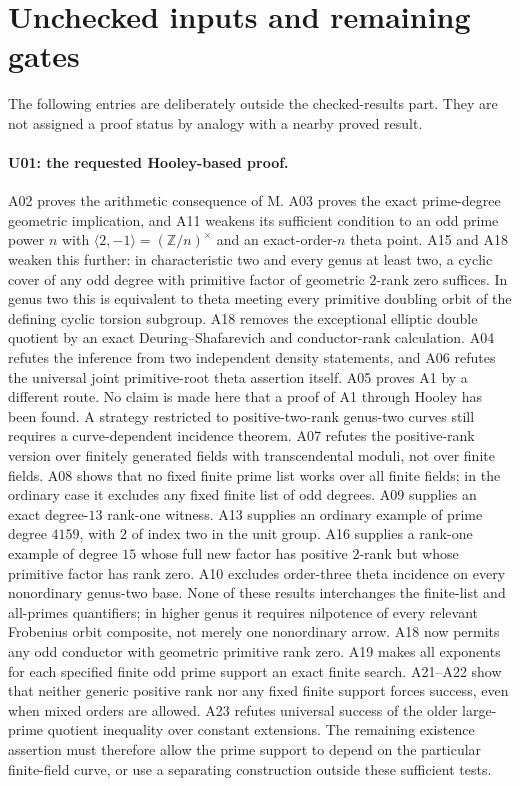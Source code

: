 \section{Unchecked inputs and remaining gates}
\label{sec:remaining}

The following entries are deliberately outside the checked-results
part. They are not assigned a proof status by analogy with a nearby
proved result.

\paragraph{U01: the requested Hooley-based proof.}
A02 proves the arithmetic consequence of M. A03 proves the exact
prime-degree geometric implication, and A11 weakens its sufficient
condition to an odd prime power $n$ with
$\langle2,-1\rangle=(\mathbb Z/n)^\times$ and an exact-order-$n$
theta point. A15 and A18 weaken this further: in characteristic two and every
genus at least two, a cyclic cover of any odd degree with primitive
factor of geometric $2$-rank zero suffices. In genus two this is
equivalent to theta meeting every primitive doubling orbit of the
defining cyclic torsion subgroup. A18 removes the exceptional
elliptic double quotient by an exact Deuring--Shafarevich and
conductor-rank calculation.
A04 refutes the inference from
two independent density statements, and A06 refutes the universal
joint primitive-root theta assertion itself. A05 proves A1 by a
different route. No claim is made here that a proof of A1 through
Hooley has been found. A strategy restricted to positive-two-rank
genus-two curves still requires a curve-dependent incidence theorem.
A07 refutes the positive-rank version over finitely generated fields
with transcendental moduli, not over finite fields. A08 shows that
no fixed finite prime list works over all finite fields; in the
ordinary case it excludes any fixed finite list of odd degrees.
A09 supplies an exact degree-$13$ rank-one witness. A13 supplies an
ordinary example of prime degree $4159$, with $2$ of index two in
the unit group. A16 supplies a rank-one example of degree $15$
whose full new factor has positive $2$-rank but whose primitive
factor has rank zero. A10 excludes order-three theta incidence on every nonordinary
genus-two base. None of
these results interchanges the finite-list and all-primes quantifiers;
in higher genus it requires nilpotence of every relevant Frobenius
orbit composite, not merely one nonordinary arrow.
A18 now permits any odd conductor with geometric primitive rank zero.
A19 makes all exponents for each specified finite odd prime support
an exact finite search. A21--A22 show that neither generic
positive rank nor any fixed finite support forces success, even
when mixed orders are allowed. A23 refutes universal success of
the older large-prime quotient inequality over constant extensions.
The remaining existence assertion must therefore allow the prime
support to depend on the particular finite-field curve, or use a
separating construction outside these sufficient tests.

